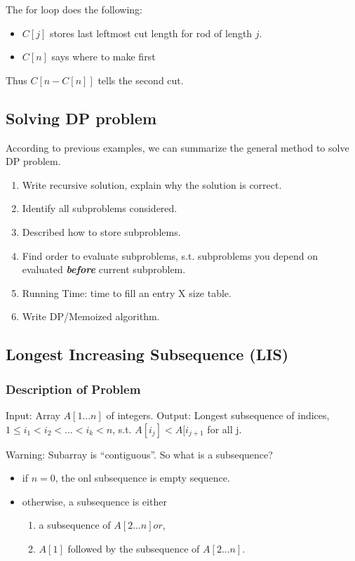 The for loop does the following:
\begin{itemize}
\item $C[j]$ stores last leftmost cut length for rod of length $j$.
\item $C[n]$ says where to make first
\end{itemize}

Thus $C[n - C[n]]$ tells the second cut.

\subsection{Solving DP problem}
According to previous examples, we can summarize the general method to solve DP problem.

\begin{enumerate}
\item Write recursive solution, explain why the solution is correct.
\item Identify all subproblems considered.
\item Described how to store subproblems.
\item Find order to evaluate subproblems, s.t. subproblems you depend on evaluated \textbf{\textit{before}} current subproblem.
\item Running Time: time to fill an entry X size table.
\item Write DP/Memoized algorithm.
\end{enumerate}

\subsection{Longest Increasing Subsequence (LIS)}
\subsubsection{Description of Problem}
Input: Array $A[1...n]$ of integers.
Output: Longest subsequence of indices, $1 \leq i_1 < i_2 < ... < i_k < n$, s.t. $A[i_j] < A[i_{j+1}$ for all j.

Warning: Subarray is ``contiguous''. So what is a subsequence?
\begin{itemize}
    \item if $n=0$, the onl subsequence is empty sequence.
    \item otherwise, a subsequence is either
    \begin{enumerate}
        \item a subsequence of $A[2...n] or$,
        \item $A[1]$ followed by the subsequence of $A[2...n]$.
    \end{enumerate}
\end{itemize}

